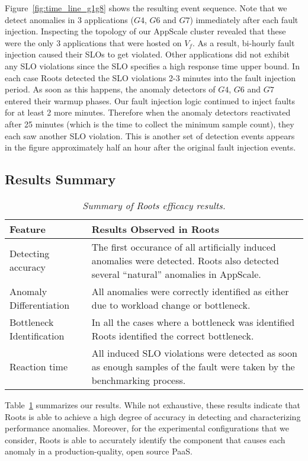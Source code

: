 Figure~\ref{fig:time_line_g1g8} shows the resulting event sequence. Note that we detect anomalies 
in 3 applications ($G4$, $G6$ and $G7$) immediately after each fault injection. Inspecting the 
topology of our AppScale cluster revealed that these were the only 3 applications that were 
hosted on $V_f$. As a result, bi-hourly fault injection caused their SLOs to
get violated. Other applications did not exhibit any SLO violations since 
the SLO specifies 
a high response time upper bound. In each case Roots detected the SLO violations 2-3 minutes into the fault injection
period. As soon as this happens, the anomaly detectors of $G4$, $G6$ and $G7$ entered their warmup phases.
Our fault injection logic continued to inject faults for at least 2 more minutes. 
Therefore when the anomaly detectors
reactivated after 25 minutes (which is the time to collect the minimum sample count), they each saw another SLO
violation. This is another set of detection events appears in the figure
approximately half an hour after the
original fault injection events.

\subsection{Results Summary}

\begin{table}
{\footnotesize
\begin{center}
\begin{tabular}{|p{2cm}|p{6cm}|}
\hline
Feature & Results Observed in Roots \\ \hline
Detecting accuracy &
The first occurance of all artificially induced anomalies were detected.
Roots also detected several ``natural'' anomalies in AppScale. \\ \hline
Anomaly Differentiation &
All anomalies were correctly identified as either due to workload change or
bottleneck. \\ \hline
Bottleneck Identification &
In all the cases where a bottleneck was identified Roots identified the
correct bottleneck. \\ \hline
Reaction time &
All induced SLO violations were detected as soon
as enough samples of the fault
were taken by the benchmarking process. \\
\hline
\end{tabular}
\end{center}
}
\vspace{-0.2in}
\caption{\textit{Summary of Roots efficacy results.
\label{tab:results_summary}
}}
\end{table}
Table~\ref{tab:results_summary} summarizes our results.
While not exhaustive, these results indicate that Roots is able to achieve a
high degree of accuracy in detecting and characterizing performance anomalies.
Moreover, for the experimental configurations that we consider, Roots is able to accurately identify
the component that causes each anomaly in a production-quality, open source PaaS.


